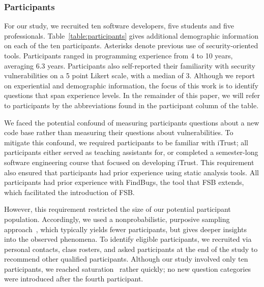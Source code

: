 \documentclass[10pt,journal,compsoc]{IEEEtran}
\begin{document}
\subsubsection{Participants}
For our study, we recruited ten software developers, five students and five professionals. 
Table~\ref{table:participants} gives additional demographic information on each of the ten participants. 
Asterisks denote previous use of security-oriented tools.
Participants ranged in programming experience from 4 to 10 years, averaging 6.3 years.
Participants also self-reported their familiarity with security vulnerabilities on a 5 point Likert scale, with a median of 3.
Although we report on experiential and demographic information, the focus of this work is to identify questions that span experience levels.
In the remainder of this paper, we will refer to participants by the abbreviations found in the participant column of the table.

We faced the potential confound of measuring participants questions about a new code base rather than measuring their questions about vulnerabilities.
To mitigate this confound, we required participants to be familiar with iTrust;
all participants either served as teaching assistants for, or completed a semester-long software engineering course that focused on developing iTrust.
This requirement also ensured that participants had prior experience using static analysis tools.
All participants had prior experience with FindBugs, the tool that FSB extends, which facilitated the introduction of FSB.

However, this requirement restricted the size of our potential participant population.
Accordingly, we used a nonprobabilistic, purposive sampling approach~\cite{guest2006many}, which typically yields fewer participants, but gives deeper insights into the observed phenomena.
To identify eligible participants, we recruited via personal contacts, class rosters, and asked participants at the end of the study to recommend other qualified participants.
Although our study involved only ten participants, we reached saturation~\cite{glaser2009discovery} rather quickly; 
no new question categories were introduced after the fourth participant.

%

\end{document}
